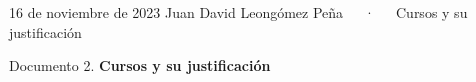 \documentclass[11pt,a4paper,]{awesome-cv}
\begin{document}
\makecvheader

\makecvfooter
  {16 de noviembre de 2023}
    {Juan David Leongómez Peña~~~·~~~Cursos y su justificación}
  {\thepage}





\vspace{4mm}
\begin{tcolorbox}[enhanced,
        on line, 
        boxsep=4pt, left=0pt,right=0pt,top=0pt,bottom=0pt,
        colframe=white,colback=black]
  
\color{white}
\begin{LARGE}\begin{center}
Documento 2. \textbf{Cursos y su justificación}
\end{center}\end{LARGE}
\end{tcolorbox}
\end{document}
